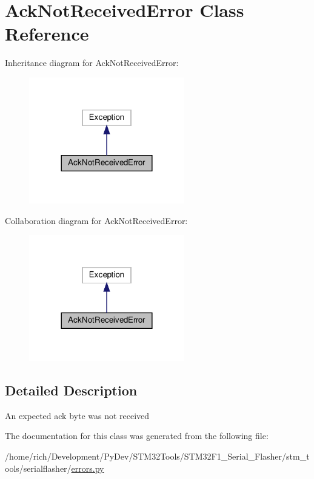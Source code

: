 \hypertarget{classstm__tools_1_1serialflasher_1_1errors_1_1AckNotReceivedError}{}\section{Ack\+Not\+Received\+Error Class Reference}
\label{classstm__tools_1_1serialflasher_1_1errors_1_1AckNotReceivedError}


Inheritance diagram for Ack\+Not\+Received\+Error\+:
\nopagebreak
\begin{figure}[H]
\begin{center}
\leavevmode
\includegraphics[width=192pt]{classstm__tools_1_1serialflasher_1_1errors_1_1AckNotReceivedError__inherit__graph}
\end{center}
\end{figure}


Collaboration diagram for Ack\+Not\+Received\+Error\+:
\nopagebreak
\begin{figure}[H]
\begin{center}
\leavevmode
\includegraphics[width=192pt]{classstm__tools_1_1serialflasher_1_1errors_1_1AckNotReceivedError__coll__graph}
\end{center}
\end{figure}


\subsection{Detailed Description}
\begin{DoxyVerb}An expected ack byte was not received\end{DoxyVerb}
 

The documentation for this class was generated from the following file\+:\begin{DoxyCompactItemize}
\item 
/home/rich/\+Development/\+Py\+Dev/\+S\+T\+M32\+Tools/\+S\+T\+M32\+F1\+\_\+\+Serial\+\_\+\+Flasher/stm\+\_\+tools/serialflasher/\hyperlink{errors_8py}{errors.\+py}\end{DoxyCompactItemize}
